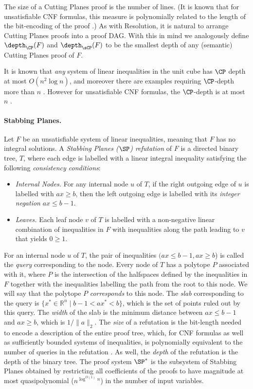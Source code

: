 \documentclass{toc}
\begin{document}
The size of a Cutting Planes proof is the number of lines.
%
%
(It is known that for   %
unsatisfiable CNF %
formulas,  %
this measure is polynomially related to the length of the bit-encoding of
the proof \cite{CookCT87}.)   %
As with Resolution, it is natural to arrange Cutting Planes proofs into a proof DAG.
With this in mind we analogously define $\depth_{\CP}(F)$ and $\depth_{\sCP}(F)$
to be the smallest depth of any (semantic) Cutting Planes proof of $F$. 

It is known that \emph{any} system of linear inequalities in the unit cube has $\CP$ depth at most
$O(n^2 \log n)$, and moreover there
are examples requiring $\CP$-depth more than $n$ \cite{EisenbrandS99}.
However for unsatisfiable CNF formulas,
the $\CP$-depth is at most $n$ \cite{BockmayrEHS99}.

\paragraph{Stabbing Planes.}
Let $F$ be an unsatisfiable system of linear inequalities, meaning that $F$ has no integral solutions.  %
%
%
%
A \emph{Stabbing Planes ($\SP$) refutation} of $F$ is a directed binary tree, $T$, where each edge is labelled with a linear integral inequality satisfying the following \emph{consistency conditions}:
\begin{itemize}
	\item \emph{Internal Nodes.} For any internal node $u$ of $T$, if the right outgoing edge of $u$ is labelled with $ax \geq b$, then the left outgoing edge is labelled with its \emph{integer negation} $ax \leq  b-1 $.
	\item \emph{Leaves.} Each leaf node $v$ of $T$ is labelled with a non-negative linear combination of inequalities in $F$ with inequalities along the path leading to $v$ that yields $0 \geq 1$.
\end{itemize}
For an internal node $u$ of $T$, the pair of inequalities $(ax \le b-1, ax \ge b$) is called the \emph{query} corresponding to the node. Every node of $T$ has a polytope $P$ associated with it, where $P$ is the
%
intersection of the halfspaces defined by the inequalities %
%
%
in $F$ together with the inequalities labelling the path from the root to this node. We will say that the polytope $P$ \emph{corresponds} to this node. 
The \emph{slab} corresponding to the query is $\{ x^* \in \mathbb{R}^n \mid b-1 < ax^* < b \}$, which is the set of points ruled out by this query. The \emph{width} of the slab is the minimum distance between $ax \leq b-1$ and $ax \geq b$, which is $1/\|a\|_2$.
The \emph{size} of a refutation is the bit-length needed to encode a description of the entire proof tree, which, for CNF formulas as well as sufficiently bounded systems of inequalities, is polynomially equivalent to the number of queries  in the refutation \cite{TseitinUpperBound}.
As well, the \emph{depth} of the refutation is the depth of the binary tree.
The proof system $\SP^*$ is the subsystem of Stabbing Planes obtained by restricting all coefficients of the proofs to have magnitude at most quasipolynomial ($n^{\log^{O(1)} n}$) in the number of input variables.
\end{document}
